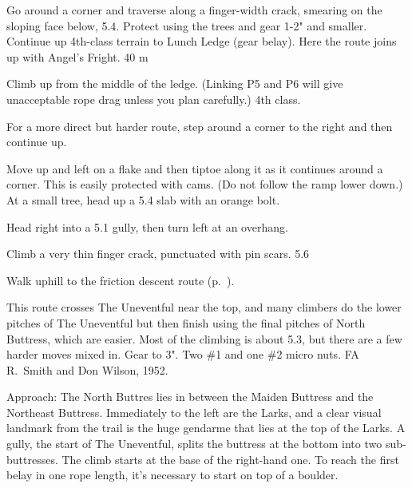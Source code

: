 \documentclass{tahquitz}
\begin{document}
 Go around a corner and traverse along a finger-width crack,
smearing on the sloping face below, 5.4. Protect using the trees and
gear 1-2" and smaller. Continue up 4th-class terrain to Lunch Ledge (gear
belay). Here the route joins up with Angel's Fright. 40 m


 Climb up from the middle of the ledge. (Linking P5 and P6 will
give unacceptable rope drag unless you plan carefully.) 4th class.

 For a more direct but harder route, step around a corner
to the right and then continue up.

 Move up and left on a flake
and then tiptoe along it as it continues around a corner.
This is easily protected with cams. (Do not follow the ramp lower down.) At a small
tree, head up a 5.4 slab with an orange bolt.

 Head right into a 5.1 gully, then turn left at an overhang.

 Climb a very thin finger crack, punctuated with pin scars. 5.6

Walk uphill to the friction descent route  (p.~\pageref{subsec:friction-descent}).





This route crosses The Uneventful near the top, and many climbers do the lower
pitches of The Uneventful but then finish using the final pitches of
North Buttress, which are easier. Most of the climbing is about 5.3,
but there are a few harder moves mixed in. Gear to 3". Two \#1 and one \#2 micro nuts.
FA R.~Smith and Don Wilson, 1952.

Approach: The North Buttres lies
in between the Maiden Buttress and the Northeast Buttress. Immediately
to the left are the Larks, and a clear visual landmark from the trail
is the huge gendarme that lies at the top of the Larks. A gully, the start
of The Uneventful, splits the buttress at the bottom into two sub-buttresses.
The climb starts at the base of the right-hand one.
To reach the first belay in one rope length, it's necessary to start on top of a boulder.
\end{document}
